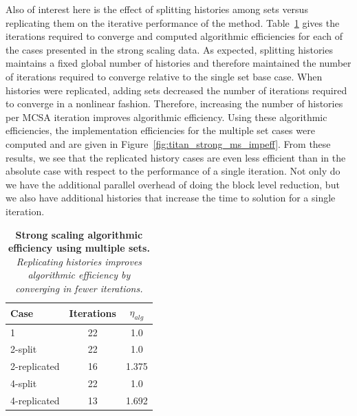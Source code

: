 Also of interest here is the effect of splitting histories among sets
versus replicating them on the iterative performance of the
method. Table~\ref{tab:ms_strong_alg_eff} gives the iterations
required to converge and computed algorithmic efficiencies for each of
the cases presented in the strong scaling data. As expected, splitting
histories maintains a fixed global number of histories and therefore
maintained the number of iterations required to converge relative to
the single set base case. When histories were replicated, adding sets
decreased the number of iterations required to converge in a nonlinear
fashion. Therefore, increasing the number of histories per MCSA
iteration improves algorithmic efficiency. Using these algorithmic
efficiencies, the implementation efficiencies for the multiple set
cases were computed and are given in
Figure~\ref{fig:titan_strong_ms_impeff}. From these results, we see
that the replicated history cases are even less efficient than in the
absolute case with respect to the performance of a single
iteration. Not only do we have the additional parallel overhead of
doing the block level reduction, but we also have additional histories
that increase the time to solution for a single iteration.

\begin{table}[h!]
  \begin{center}
    \begin{tabular}{lcc}\hline\hline
      \multicolumn{1}{l}{Case}& 
      \multicolumn{1}{c}{Iterations}&
      \multicolumn{1}{c}{$\eta_{alg}$} \\\hline
      1 & 22 & 1.0 \\
      2-split & 22 & 1.0 \\
      2-replicated & 16 & 1.375 \\
      4-split & 22 & 1.0 \\
      4-replicated & 13 & 1.692 \\
      \hline\hline
    \end{tabular}
  \end{center}
  \caption{\textbf{Strong scaling algorithmic efficiency using
      multiple sets.} \textit{Replicating histories improves
      algorithmic efficiency by converging in fewer iterations.}}
  \label{tab:ms_strong_alg_eff}
\end{table}

